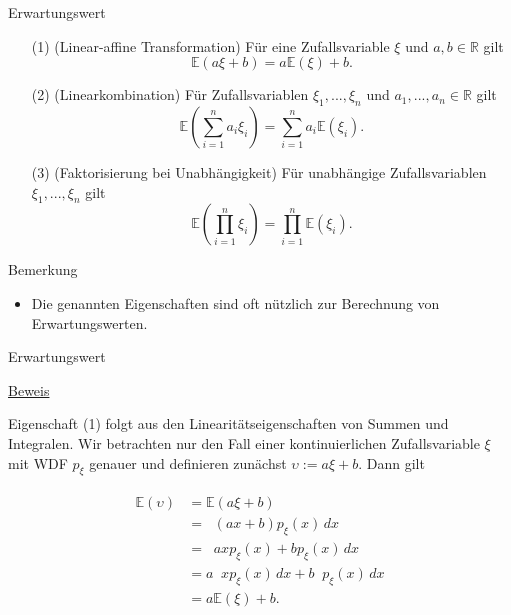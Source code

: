 \documentclass[
  8pt,
  ignorenonframetext,
]{beamer}
\providecommand{\tightlist}{%
  \setlength{\itemsep}{0pt}\setlength{\parskip}{0pt}}
\newcommand{\ups}{\upsilon}
\DeclareMathOperator*{\intinf}{\int_{-\infty}^{\infty}}
\begin{document}
\begin{frame}{Erwartungswert}
\protect\hypertarget{erwartungswert-4}{}
\small
\begin{theorem}
\normalfont
\justifying
\begin{itemize}
\item[(1)] (Linear-affine Transformation) Für eine Zufallsvariable $\xi$ und $a,b\in \mathbb{R}$ gilt
\begin{equation}
\mathbb{E}(a\xi + b) = a\mathbb{E}(\xi) + b.
\end{equation}
\item[(2)] (Linearkombination) Für Zufallsvariablen $\xi_1,...,\xi_n$ und $a_1,...,a_n \in \mathbb{R}$ gilt
\begin{equation}
\mathbb{E}\left(\sum_{i=1}^n a_i\xi_i \right) = \sum_{i = 1}^n a_i \mathbb{E}(\xi_i).
\end{equation}
\item [(3)] (Faktorisierung bei Unabhängigkeit) Für unabhängige Zufallsvariablen $\xi_1,...,\xi_n$ gilt
\begin{equation}
\mathbb{E}\left(\prod_{i=1}^n \xi_i \right) = \prod_{i = 1}^n \mathbb{E}(\xi_i).
\end{equation}
\end{itemize}
\end{theorem}

\footnotesize

Bemerkung

\begin{itemize}
\tightlist
\item
  Die genannten Eigenschaften sind oft nützlich zur Berechnung von
  Erwartungswerten.
\end{itemize}
\end{frame}

\begin{frame}{Erwartungswert}
\protect\hypertarget{erwartungswert-5}{}
\footnotesize

\underline{Beweis} \vspace{2mm}

Eigenschaft (1) folgt aus den Linearitätseigenschaften von Summen und
Integralen. Wir betrachten nur den Fall einer kontinuierlichen
Zufallsvariable \(\xi\) mit WDF \(p_\xi\) genauer und definieren
zunächst \(\ups := a\xi + b\). Dann gilt

\begin{align}
\begin{split}
\mathbb{E}(\ups)
& = \mathbb{E}(a\xi + b)                                        \\
& = \intinf (ax + b)p_\xi(x) \,dx                               \\
& = \intinf  axp_\xi(x)  + b p_\xi(x) \,dx                      \\
& = a\intinf xp_\xi(x) \,dx + b \intinf p_\xi(x) \,dx           \\
& = a\mathbb{E}(\xi) + b.
\end{split}
\end{align}
\end{frame}
\end{document}
